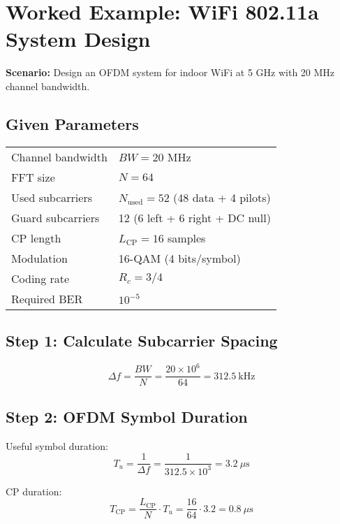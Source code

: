 \section{Worked Example: WiFi 802.11a System Design}

\textbf{Scenario:} Design an OFDM system for indoor WiFi at 5 GHz with 20 MHz channel bandwidth.

\subsection*{Given Parameters}

\begin{tabular}{@{}ll@{}}
Channel bandwidth & $BW = 20$ MHz \\
FFT size & $N = 64$ \\
Used subcarriers & $N_{\mathrm{used}} = 52$ (48 data + 4 pilots) \\
Guard subcarriers & 12 (6 left + 6 right + DC null) \\
CP length & $L_{\mathrm{CP}} = 16$ samples \\
Modulation & 16-QAM (4 bits/symbol) \\
Coding rate & $R_c = 3/4$ \\
Required BER & $10^{-5}$ \\
\end{tabular}

\subsection*{Step 1: Calculate Subcarrier Spacing}

\begin{equation}
\Delta f = \frac{BW}{N} = \frac{20 \times 10^6}{64} = 312.5\ \text{kHz}
\end{equation}

\subsection*{Step 2: OFDM Symbol Duration}

Useful symbol duration:
\begin{equation}
T_u = \frac{1}{\Delta f} = \frac{1}{312.5 \times 10^3} = 3.2\ \mu\text{s}
\end{equation}

CP duration:
\begin{equation}
T_{\mathrm{CP}} = \frac{L_{\mathrm{CP}}}{N} \cdot T_u = \frac{16}{64} \cdot 3.2 = 0.8\ \mu\text{s}
\end{equation}

